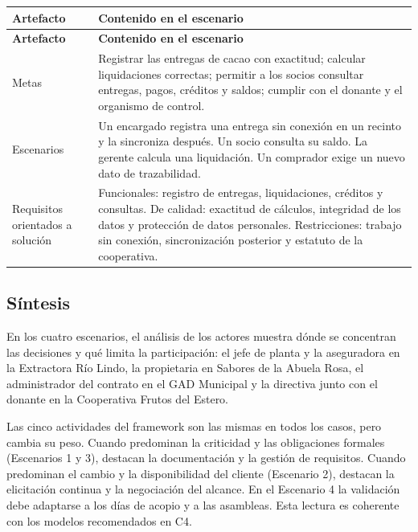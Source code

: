 \documentclass[12pt,a4paper]{article}
\begin{document}
{\small
\setlength{\tabcolsep}{4pt}
\renewcommand{\arraystretch}{1.3}
\begin{longtable}{
|>{\raggedright\arraybackslash}p{}
|>{\raggedright\arraybackslash}p{}|}
\hline
\textbf{Artefacto} & \textbf{Contenido en el escenario} \\
\hline
\endfirsthead
\hline
\textbf{Artefacto} & \textbf{Contenido en el escenario} \\
\hline
\endhead
Metas & Registrar las entregas de cacao con exactitud; calcular liquidaciones correctas; permitir a los socios consultar entregas, pagos, créditos y saldos; cumplir con el donante y el organismo de control. \\
\hline
Escenarios & Un encargado registra una entrega sin conexión en un recinto y la sincroniza después. Un socio consulta su saldo. La gerente calcula una liquidación. Un comprador exige un nuevo dato de trazabilidad. \\
\hline
Requisitos orientados a solución & Funcionales: registro de entregas, liquidaciones, créditos y consultas. De calidad: exactitud de cálculos, integridad de los datos y protección de datos personales. Restricciones: trabajo sin conexión, sincronización posterior y estatuto de la cooperativa. \\
\hline
\end{longtable}
}

\subsection{Síntesis}

En los cuatro escenarios, el análisis de los actores muestra dónde se concentran las decisiones y qué limita la participación: el jefe de planta y la aseguradora en la Extractora Río Lindo, la propietaria en Sabores de la Abuela Rosa, el administrador del contrato en el GAD Municipal y la directiva junto con el donante en la Cooperativa Frutos del Estero.

Las cinco actividades del framework son las mismas en todos los casos, pero cambia su peso. Cuando predominan la criticidad y las obligaciones formales (Escenarios 1 y 3), destacan la documentación y la gestión de requisitos. Cuando predominan el cambio y la disponibilidad del cliente (Escenario 2), destacan la elicitación continua y la negociación del alcance. En el Escenario 4 la validación debe adaptarse a los días de acopio y a las asambleas. Esta lectura es coherente con los modelos recomendados en C4.
\end{document}
